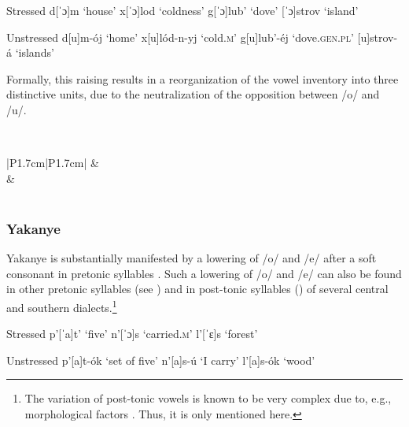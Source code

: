 \documentclass[output=paper,
modfonts,
newtxmath,
hidelinks,
]{langscibook}
\begin{document}
\ea\label{5:13}\begin{multicols}{2}
\begin{xlist}
\exi{} {Stressed}
\ex d[ˈɔ]m \tabto{2.1cm}‘house’\label{5:13a}
\exi{} x[ˈɔ]lod \tabto{2.1cm}‘coldness’
\ex g[ˈɔ]lub’ \tabto{2.1cm}‘dove’\label{5:13b}
\exi{} {[ˈɔ]strov} \tabto{2.1cm}‘island’
\end{xlist}\columnbreak
\begin{xlist}
\exi{} {Unstressed}
\exi{} d[u]m-ój \tabto{2.1cm}‘home’
\exi{} x[u]lód-n-yj \tabto{2.1cm}‘cold.\textsc{m}’
\exi{} g[u]lub’-éj \tabto{2.1cm}‘dove.\textsc{gen.pl}’
\exi{} {[u]strov-á} \tabto{2.1cm}‘islands’
\end{xlist}
\end{multicols}
\z

\noindent Formally, this raising results in a reorganization of the vowel inventory into three distinctive units, due to the neutralization of the opposition between /o/ and /u/.

\label{5:14}\\\medskip
\begin{tabular}{|P{1.7cm}|P{1.7cm}|}
\hline
[ɨ]&\\\hhline{-~}
\shadecell{}&\\\hline
{}\\\hline
\end{tabular}
\z


\subsubsection{Yakanye}\label{5:s2.3.2}

Yakanye is substantially manifested by a lowering of /o/ and /e/ after a soft consonant in pretonic syllables . Such a lowering of /o/ and /e/ can also be found in other pretonic syllables (see \citealt[§96]{Avanesov1949}) and in post-tonic syllables (\citealt[§108--112]{Avanesov1949}) of several central and southern dialects.\footnote{The variation of post-tonic vowels is known to be very complex due to, e.g., morphological factors \citep[§107]{Avanesov1949}. Thus, it is only mentioned here.}\vspace{-\baselineskip}

\ea\label{5:15}\begin{multicols}{2}
\begin{xlist}
\exi{} {Stressed}
\exi{} p’[ˈa]t’ \tabto{2.1cm}‘five’
\exi{} n’[ˈɔ]s \tabto{2.1cm}‘carried.\textsc{m}’
\exi{} l’[ˈɛ]s \tabto{2.1cm}‘forest’
\end{xlist}\columnbreak
\begin{xlist}
\exi{} {Unstressed}
\exi{} p’[a]t-ók \tabto{2.1cm}‘set of five’
\exi{} n’[a]s-ú \tabto{2.1cm}‘I carry’
\exi{} l’[a]s-ók \tabto{2.1cm}‘wood’
\end{xlist}
\end{multicols}
\z
\end{document}
